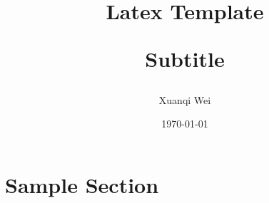 \documentclass[12pt]{article}
\title{Latex Template \\
\begin{large} 
  Subtitle
\end{large} 
}
\author{Xuanqi Wei}
\date{\today}
\begin{document}
\maketitle
\thispagestyle{empty}

\newpage

\tableofcontents
\thispagestyle{empty}

\newpage

\setcounter{page}{1}

\section{Sample Section}



\end{document}
